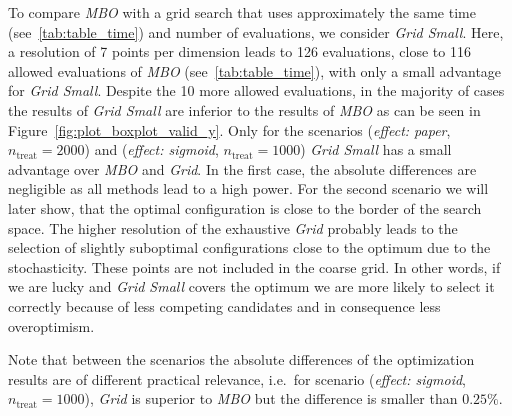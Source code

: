 \documentclass[bimj,fleqn]{w-art}
\theoremstyle{plain}
\theoremstyle{definition}
\begin{document}
To compare \emph{MBO} with a grid search that uses approximately the same time (see~\ref{tab:table_time}) and number of evaluations, we consider \emph{Grid Small}.
Here, a resolution of 7 points per dimension leads to 126 evaluations, close to 116 allowed evaluations of \emph{MBO} (see~\ref{tab:table_time}), with only a small advantage for \emph{Grid Small}.
Despite the 10 more allowed evaluations, in the majority of cases the results of \emph{Grid Small} are inferior to the results of \emph{MBO} as can be seen in Figure~\ref{fig:plot_boxplot_valid_y}.
Only for the scenarios (\emph{effect: paper}, $n_{\text{treat}} = 2000$) and (\emph{effect: sigmoid}, $n_{\text{treat}} = 1000$) \emph{Grid Small} has a small advantage over \emph{MBO} and \emph{Grid}.
In the first case, the absolute differences are negligible as all methods lead to a high power.
For the second scenario we will later show, that the optimal configuration is close to the border of the search space.
The higher resolution of the exhaustive \emph{Grid} probably leads to the selection of slightly suboptimal configurations close to the optimum due to the stochasticity.
These points are not included in the coarse grid.
In other words, if we are lucky and \emph{Grid Small} covers the optimum we are more likely to select it correctly because of less competing candidates and in consequence less overoptimism.

Note that between the scenarios the absolute differences of the optimization results are of different practical relevance,
i.e.\ for scenario (\emph{effect: sigmoid}, $n_{\text{treat}} = 1000$), \emph{Grid} is superior to \emph{MBO} but the difference is smaller than $0.25\%$.
\end{document}
